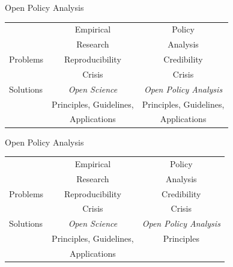 \documentclass{beamer}
\def\white{\color{white}}
\begin{document}
\begin{frame}{Open Policy Analysis}
\begin{table}[ht]
\centering
\begin{tabular}[t]{|l|c|c|}
\hline
& Empirical  & Policy \\
& Research & Analysis \\

\hline
Problems & Reproducibility  &  Credibility \\
				 &  Crisis & Crisis \\
\hline
Solutions &  \textit{Open Science }&    {\white \textit{Open Policy Analysis } }\\
 & Principles, Guidelines,  &   {\white Principles, Guidelines,}\\
 & Applications &   {\white Applications}\\

\hline
\end{tabular}
\end{table}%
\end{frame}

\begin{frame}[noframenumbering]{Open Policy Analysis}
\begin{table}[ht]
\centering
\begin{tabular}[t]{|l|c|c|}
\hline
& Empirical  & Policy \\
& Research & Analysis \\

\hline
Problems & Reproducibility  &  Credibility \\
				 &  Crisis & Crisis \\
\hline
Solutions &  \textit{Open Science }&    \textit{Open Policy Analysis } \\
 & Principles, Guidelines,  &   Principles\\
 & Applications &   \\

\hline
\end{tabular}
\end{table}%
\end{frame}
\end{document}
